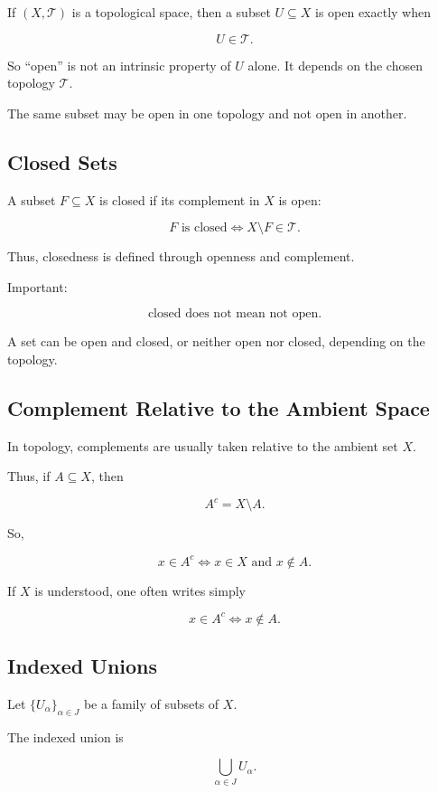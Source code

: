 \documentclass{article}
\begin{document}
	If \((X,\mathcal{T})\) is a topological space, then a subset \(U\subseteq X\) is open exactly when
	
	$$
	U\in\mathcal{T}.
	$$
	
	So ``open'' is not an intrinsic property of \(U\) alone. It depends on the chosen topology \(\mathcal{T}\).
	
	The same subset may be open in one topology and not open in another.
	
	\subsection{Closed Sets}
	
	A subset \(F\subseteq X\) is closed if its complement in \(X\) is open:
	
	$$
	F\text{ is closed}
	\iff
	X\setminus F\in\mathcal{T}.
	$$
	
	Thus, closedness is defined through openness and complement.
	
	Important:
	
	$$
	\text{closed does not mean not open.}
	$$
	
	A set can be open and closed, or neither open nor closed, depending on the topology.
	
	\subsection{Complement Relative to the Ambient Space}
	
	In topology, complements are usually taken relative to the ambient set \(X\).
	
	Thus, if \(A\subseteq X\), then
	
	$$
	A^c=X\setminus A.
	$$
	
	So,
	
	$$
	x\in A^c
	\iff
	x\in X \text{ and } x\notin A.
	$$
	
	If \(X\) is understood, one often writes simply
	
	$$
	x\in A^c
	\iff
	x\notin A.
	$$
	
	\subsection{Indexed Unions}
	
	Let \(\{U_\alpha\}_{\alpha\in J}\) be a family of subsets of \(X\).
	
	The indexed union is
	
	$$
	\bigcup_{\alpha\in J}U_\alpha.
	$$
	
\end{document}
